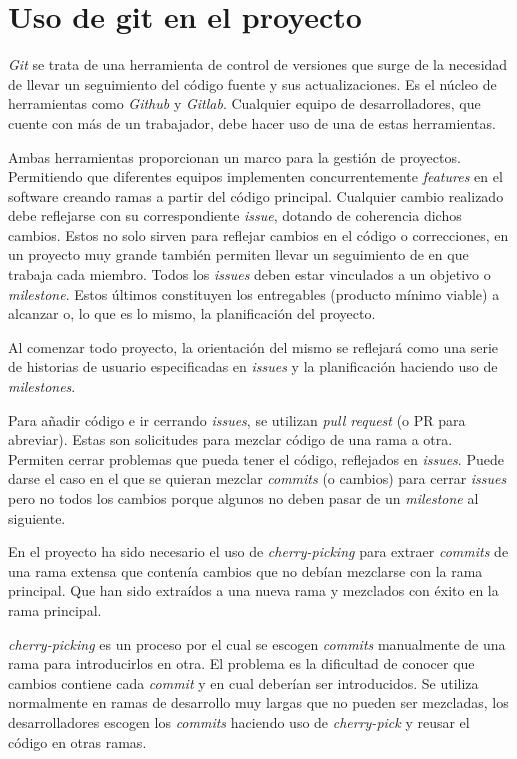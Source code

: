 \section{Uso de git en el proyecto}
\emph{Git} se trata de una herramienta de control de versiones que surge de la necesidad de llevar un seguimiento del código fuente y sus actualizaciones. Es el núcleo de herramientas como \emph{Github} y \emph{Gitlab}. Cualquier equipo de desarrolladores, que cuente con más de un trabajador, debe hacer uso de una de estas herramientas.

Ambas herramientas proporcionan un marco para la gestión de proyectos. Permitiendo que diferentes equipos implementen concurrentemente \emph{features} en el software creando ramas a partir del código principal. Cualquier cambio realizado debe reflejarse con su correspondiente \emph{issue}, dotando de coherencia dichos cambios. Estos no solo sirven para reflejar cambios en el código o correcciones, en un proyecto muy grande también permiten llevar un seguimiento de en que trabaja cada miembro. Todos los \emph{issues} deben estar vinculados a un objetivo o \emph{milestone}. Estos últimos constituyen los entregables (producto mínimo viable) a alcanzar o, lo que es lo mismo, la planificación del proyecto.

Al comenzar todo proyecto, la orientación del mismo se reflejará como una serie de historias de usuario especificadas en \emph{issues} y la planificación haciendo uso de \emph{milestones}.

Para añadir código e ir cerrando \emph{issues}, se utilizan \emph{pull request} (o PR para abreviar). Estas son solicitudes para mezclar código de una rama a otra. Permiten cerrar problemas que pueda tener el código, reflejados en \emph{issues}. Puede darse el caso en el que se quieran mezclar \emph{commits} (o cambios) para cerrar \emph{issues} pero no todos los cambios porque algunos no deben pasar de un \emph{milestone} al siguiente.

En el proyecto ha sido necesario el uso de \emph{cherry-picking} para extraer \emph{commits} de una rama extensa que contenía cambios que no debían mezclarse con la rama principal. Que han sido extraídos a una nueva rama y mezclados con éxito en la rama principal.

\emph{cherry-picking} es un proceso por el cual se escogen \emph{commits} manualmente de una rama para introducirlos en otra. El problema es la dificultad de conocer que cambios contiene cada \emph{commit} y en cual deberían ser introducidos. Se utiliza normalmente en ramas de desarrollo muy largas que no pueden ser mezcladas, los desarrolladores escogen los \emph{commits} haciendo uso de \emph{cherry-pick} y reusar el código en otras ramas.\cite{bunyakiati2017cherry}

